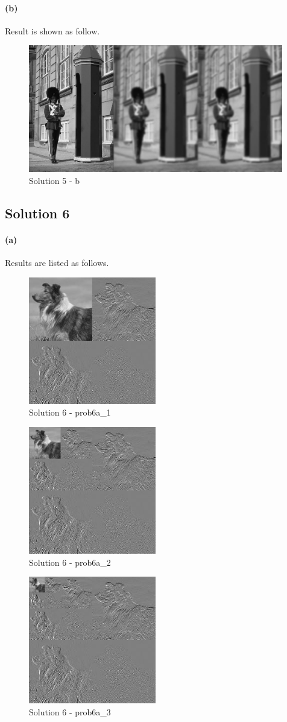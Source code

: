 \documentclass{article}
\newcommand{\solution}[1]{\clearpage \subsection*{Solution #1}}
\newcommand{\spart}[1]{\paragraph{(#1)}}
\begin{document}
\spart{b}
Result is shown as follow.
\begin{figure}[!h]
  \centering
  \includegraphics[height=15em]{"code/outputs/prob5.jpg"}
  \caption{Solution 5 - b}
\end{figure}
\solution{6}
\spart{a}
Results are listed as follows.
\begin{figure}[!h]
  \centering
  \includegraphics[height=15em]{"code/outputs/prob6a_1.jpg"}
  \caption{Solution 6 - prob6a\_1}
\end{figure}
\begin{figure}[!h]
  \centering
  \includegraphics[height=15em]{"code/outputs/prob6a_2.jpg"}
  \caption{Solution 6 - prob6a\_2}
\end{figure}
\begin{figure}[!h]
  \centering
  \includegraphics[height=15em]{"code/outputs/prob6a_3.jpg"}
  \caption{Solution 6 - prob6a\_3}
\end{figure}
\end{document}
